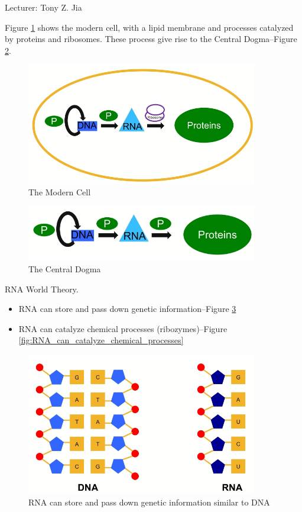 \documentclass[]{article}
\begin{document}
Lecturer: Tony Z. Jia

Figure \ref{fig:ModernCellSchematic} shows the modern cell, with a lipid membrane and processes catalyzed by proteins and ribosomes. These process give rise to the Central Dogma--Figure \ref{fig:CentralDogmaModernCell}.
\begin{figure}[H]
	\caption{The Modern Cell}\label{fig:ModernCellSchematic}
	\includegraphics[width=0.9\textwidth]{ModernCellSchematic}
\end{figure}

\begin{figure}[H]
	\caption{The Central Dogma}\label{fig:CentralDogmaModernCell}
	\includegraphics[width=0.9\textwidth]{CentralDogmaModernCell}
\end{figure}

RNA World Theory.
\begin{itemize}
	\item  RNA can store and pass down genetic information--Figure \ref{fig:RNA_WorldTheory}
	\item  RNA can catalyze chemical processes (ribozymes)--Figure \ref{fig:RNA_can_catalyze_chemical_processes}\cite{scott2013hammerhead}
\end{itemize}
\begin{figure}[H]
	\caption{RNA can store and pass down genetic information similar to DNA}\label{fig:RNA_WorldTheory}
	\includegraphics[width=0.9\textwidth]{RNA_WorldTheory}
\end{figure}
\end{document}

